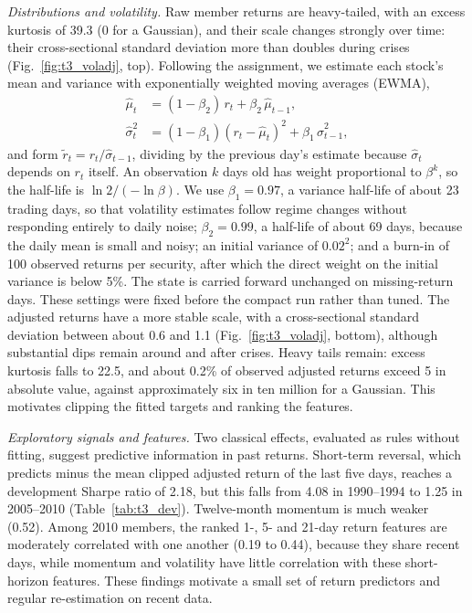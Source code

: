 \documentclass[conference]{IEEEtran}
\begin{document}
\textit{Distributions and volatility.} Raw member returns are heavy-tailed, with an excess kurtosis of 39.3 (0 for a Gaussian), and their scale changes strongly over time: their cross-sectional standard deviation more than doubles during crises (Fig.~\ref{fig:t3_voladj}, top). Following the assignment, we estimate each stock's mean and variance with exponentially weighted moving averages (EWMA),
\begin{align}
\hat\mu_t &= (1-\beta_2)\,r_t + \beta_2\,\hat\mu_{t-1},\\
\hat\sigma^2_t &= (1-\beta_1)(r_t-\hat\mu_t)^2
                 + \beta_1\,\hat\sigma^2_{t-1},
\end{align}
and form $\tilde r_t=r_t/\hat\sigma_{t-1}$, dividing by the previous day's estimate because $\hat\sigma_t$ depends on $r_t$ itself. An observation $k$ days old has weight proportional to $\beta^k$, so the half-life is $\ln 2/(-\ln\beta)$. We use $\beta_1=0.97$, a variance half-life of about 23 trading days, so that volatility estimates follow regime changes without responding entirely to daily noise; $\beta_2=0.99$, a half-life of about 69 days, because the daily mean is small and noisy; an initial variance of $0.02^2$; and a burn-in of 100 observed returns per security, after which the direct weight on the initial variance is below 5\%. The state is carried forward unchanged on missing-return days. These settings were fixed before the compact run rather than tuned. The adjusted returns have a more stable scale, with a cross-sectional standard deviation between about 0.6 and 1.1 (Fig.~\ref{fig:t3_voladj}, bottom), although substantial dips remain around and after crises. Heavy tails remain: excess kurtosis falls to 22.5, and about 0.2\% of observed adjusted returns exceed 5 in absolute value, against approximately six in ten million for a Gaussian. This motivates clipping the fitted targets and ranking the features.

\textit{Exploratory signals and features.} Two classical effects, evaluated as rules without fitting, suggest predictive information in past returns. Short-term reversal, which predicts minus the mean clipped adjusted return of the last five days, reaches a development Sharpe ratio of 2.18, but this falls from 4.08 in 1990--1994 to 1.25 in 2005--2010 (Table~\ref{tab:t3_dev}). Twelve-month momentum is much weaker (0.52). Among 2010 members, the ranked 1-, 5- and 21-day return features are moderately correlated with one another (0.19 to 0.44), because they share recent days, while momentum and volatility have little correlation with these short-horizon features. These findings motivate a small set of return predictors and regular re-estimation on recent data.
\end{document}
